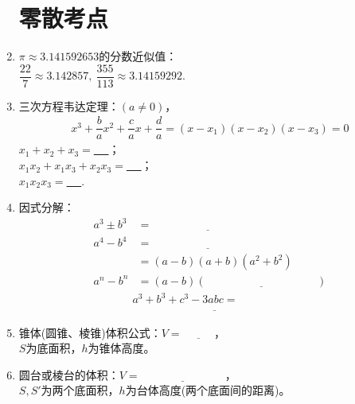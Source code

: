 \documentclass{article}
\newif\ifte
\begin{document}
\begin{multicols}{2}
\begin{enumerate}[leftmargin=20pt]
\section{零散考点}
\item $ \pi\approx 3.141592653 $的分数近似值：\\ $ \dfrac{22}{7} 
\approx 3.142857,\ \dfrac{355}{113}\approx 3.14159292 $. 

\item 三次方程韦达定理：$ (a\neq 0) $，
\begin{gather*}
    x^3+\dfrac{b}{a}x^2+\dfrac{c}{a}x+
    \dfrac{d}{a}=(x-x_1)(x-x_2)(x-x_3)=0
\end{gather*}
$ x_1+x_2+x_3= $\underline{\ \ifte $ -\dfrac{b}{a} $\else 
    \hspace{2cm} \fi\ }；\\
$ x_1x_2+x_1x_3+x_2x_3= $\underline{\ \ifte $ \dfrac{c}{a} $ 
    \else \hspace{2cm} \fi\ }；\\
$ x_1x_2x_3= $\underline{\ \ifte $ -\dfrac{d}{a} $ \else \hspace{2cm} \fi\ }.

\item 因式分解：
\begin{align*}
    a^3\pm b^3 &=\underline{\ \ifte (a\pm b)(a^2\mp ab+b^2)
        \else \hspace{4cm} \fi\ } \\
    a^4-b^4 &=\underline{\ \ifte (a-b)(a^3+a^2b+ab^2+b^3)
        \else \hspace{4cm} \fi\ } \\
          &=(a-b)(a+b)(a^2+b^2) \\
    a^n-b^n &=(a-b)(\underline{\ \ifte 
        a^{n-1}+a^{n-2}b+\cdots+b^{n-1}
        \else \hspace{4cm} \fi\ })
\end{align*}
\begin{align*}
   & a^3+b^3+c^3-3abc=\\ & \underline{\ \ifte 
    (a+b+c)(a^2+b^2+c^2-ab-bc-ca) \else \hspace{6cm} \fi\ } 
\end{align*}

\item 锥体(圆锥、棱锥)体积公式：$ V=\underline{\ \ifte 
    \dfrac{1}{3}Sh\else \hspace{1cm} \fi\ } $，\\
$ S $为底面积，$ h $为锥体高度。

\item 圆台或棱台的体积：$ V=\underline{\ \ifte 
\dfrac{1}{3}(S+\sqrt{SS'}+S')h\else \hspace{3cm} \fi\ } $，\\
$ S,S' $为两个底面积，$ h $为台体高度(两个底面间的距离)。


\end{enumerate}
\end{multicols}
\end{document}
